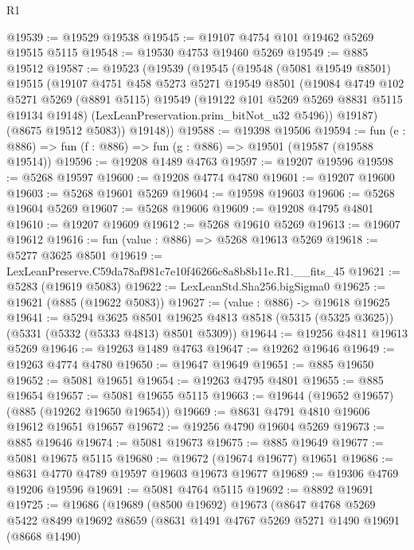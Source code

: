 \begin{lexlean}{R1}
\begin{coremodule}
@19539 := @19529 @19538
@19545 := @19107 @4754 @101 @19462 @5269 @19515 @5115
@19548 := @19530 @4753 @19460 @5269
@19549 := @885 @19512
@19587 := @19523
    (@19539
      (@19545
        (@19548
          (@5081 @19549 @8501)
          @19515
          (@19107
            @4751
            @458
            @5273
            @5271
            @19549
            @8501
            (@19084
              @4749
              @102
              @5271
              @5269
              (@8891 @5115)
              @19549
              (@19122 @101 @5269 @5269 @8831 @5115 @19134 @19148)
              (LexLeanPreservation.prim_bitNot_u32 @5496))
            @19187)
          (@8675 @19512 @5083))
        @19148))
@19588 := @19398 @19506
@19594 := fun (e : @886) => fun (f : @886) => fun (g : @886) => @19501 (@19587 (@19588 @19514))
@19596 := @19208 @1489 @4763
@19597 := @19207 @19596
@19598 := @5268 @19597
@19600 := @19208 @4774 @4780
@19601 := @19207 @19600
@19603 := @5268 @19601 @5269
@19604 := @19598 @19603
@19606 := @5268 @19604 @5269
@19607 := @5268 @19606
@19609 := @19208 @4795 @4801
@19610 := @19207 @19609
@19612 := @5268 @19610 @5269
@19613 := @19607 @19612
@19616 := fun (value : @886) => @5268 @19613 @5269
@19618 := @5277 @3625 @8501
@19619 := LexLeanPreserve.C59da78af981c7e10f46266c8a8b8b11e.R1.__fits_45
@19621 := @5283 (@19619 @5083)
@19622 := LexLeanStd.Sha256.bigSigma0
@19625 := @19621 (@885 (@19622 @5083))
@19627 := (value : @886) -> @19618 @19625
@19641 := @5294
    @3625
    @8501
    @19625
    @4813
    @8518
    (@5315 (@5325 @3625))
    (@5331 (@5332 (@5333 @4813) @8501 @5309))
@19644 := @19256 @4811 @19613 @5269
@19646 := @19263 @1489 @4763
@19647 := @19262 @19646
@19649 := @19263 @4774 @4780
@19650 := @19647 @19649
@19651 := @885 @19650
@19652 := @5081 @19651
@19654 := @19263 @4795 @4801
@19655 := @885 @19654
@19657 := @5081 @19655 @5115
@19663 := @19644 (@19652 @19657) (@885 (@19262 @19650 @19654))
@19669 := @8631 @4791 @4810 @19606 @19612 @19651 @19657
@19672 := @19256 @4790 @19604 @5269
@19673 := @885 @19646
@19674 := @5081 @19673
@19675 := @885 @19649
@19677 := @5081 @19675 @5115
@19680 := @19672 (@19674 @19677) @19651
@19686 := @8631 @4770 @4789 @19597 @19603 @19673 @19677
@19689 := @19306 @4769 @19206 @19596
@19691 := @5081 @4764 @5115
@19692 := @8892 @19691
@19725 := @19686
    (@19689
      (@8500 @19692)
      @19673
      (@8647
        @4768
        @5269
        @5422
        @8499
        @19692
        @8659
        (@8631
          @1491
          @4767
          @5269
          @5271
          @1490
          @19691
          (@8668 @1490)

\end{coremodule}
\end{lexlean}
